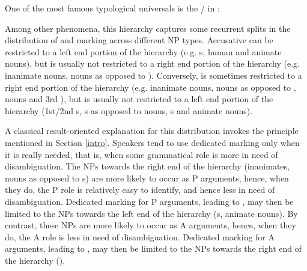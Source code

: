 \documentclass[output=paper]{langsci/langscibook}
\begin{document}
One of the most famous typological universals is the / in :



\noindent Among other phenomena, this hierarchy captures some recurrent splits
in the distribution of
 and   marking 
 across different NP types.
 Accusative 
  can be restricted to a left end portion of the hierarchy (e.g.  s, human and animate
nouns), but is usually not restricted to a right end portion of the hierarchy (e.g. inanimate nouns, nouns as opposed to
). Conversely,    is sometimes restricted to a right end portion of the hierarchy (e.g. inanimate
nouns, nouns as opposed to , nouns and 3rd  ), but is usually not restricted to a left end portion of the hierarchy
(1st/2nd  s, s as opposed to nouns, s and animate nouns).

A classical result-oriented explanation  for this distribution invokes the 
principle mentioned in Section \ref{intro}. Speakers  tend to use dedicated  marking  only when
it is really needed, that is, when some grammatical role is more in
need of disambiguation. The NPs towards the right end of the
hierarchy (inanimates, nouns as opposed to s) are more likely to occur as P arguments, hence, when they do, the P role is relatively easy to identify, and hence less in need of disambiguation. Dedicated  marking for P arguments, leading to  , may then be limited to the NPs towards the left end of the hierarchy (s, animate nouns). By contrast, these NPs are more likely to occur as A arguments, hence, when they do, the A role is less in need of disambiguation. Dedicated  marking for A arguments, leading to
 , may then be limited to the NPs towards the right end of the hierarchy
 (\citealt{Silverstein1976,Dixon1979_Erg,Dixon1994_Erg,Comrie1981_Typ,DeLancey1981,Song2001,TU2}). 
\end{document}
